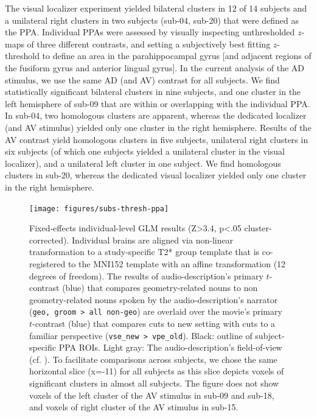 \documentclass[english]{article}
\begin{document}
The visual localizer experiment \citep{sengupta2016extension} yielded bilateral
clusters in 12 of 14 subjects and a unilateral right clusters in two subjects
(sub-04, sub-20) that were defined as the PPA.
Individual PPAs were assessed by visually inspecting unthresholded $z$-maps of
three different contrasts, and setting a subjectively best fitting $z$-threshold
to define an area in the parahippocampal gyrus [and adjacent regions of the
fusiform gyrus and anterior lingual gyrus].
In the current analysis of the AD stimulus, we use the same AD (and AV) contrast
for all subjects. We find statistically significant bilateral clusters in nine
subjects, and one cluster in the left hemisphere of sub-09 that are within or
overlapping with the individual PPA.
In sub-04, two homologous clusters are apparent, whereas the dedicated localizer
(and AV stimulus) yielded only one cluster in the right hemisphere.
Results of the AV contrast yield homologous clusters in five subjects,
unilateral right clusters in six subjects (of which one subjects yielded a
unilateral cluster in the visual localizer), and a unilateral left cluster in
one subject.
We find homologous clusters in sub-20, whereas the dedicated visual localizer
yielded only one cluster in the right hemisphere.


\begin{figure} \centering
    \texttt{[image: figures/subs-thresh-ppa]}
    \caption{Fixed-effects individual-level GLM results (Z>3.4, p<.05
        cluster-corrected).
        Individual brains are aligned via non-linear
        transformation to a study-specific T2* group template that is
        co-registered to the MNI152 template with an affine transformation (12
        degrees of freedom).
        The results of audio-description's primary
        $t$-contrast (blue) that compares geometry-related nouns to non
        geometry-related nouns spoken by the audio-description's narrator
        (\texttt{geo, groom > all non-geo}) are overlaid over the movie's
        primary $t$-contrast (blue) that compares cuts to new setting with cuts
        to a familiar perspective (\texttt{vse\_new > vpe\_old}).
        Black:
        outline of subject-specific PPA ROIs.
        Light gray: The
        audio-description's field-of-view (cf. \citep{hanke2014audiomovie}).
        To facilitate comparisons across subjects, we chose the same horizontal
        slice (x=-11) for all subjects as this slice depicts voxels of
        significant clusters in almost all subjects.
        The figure does not show voxels of the left cluster of the AV stimulus
        in sub-09 and sub-18, and voxels of right cluster of the AV stimulus in
        sub-15.}
    \label{fig:subs-thresh-ppa}
\end{figure}
\end{document}
